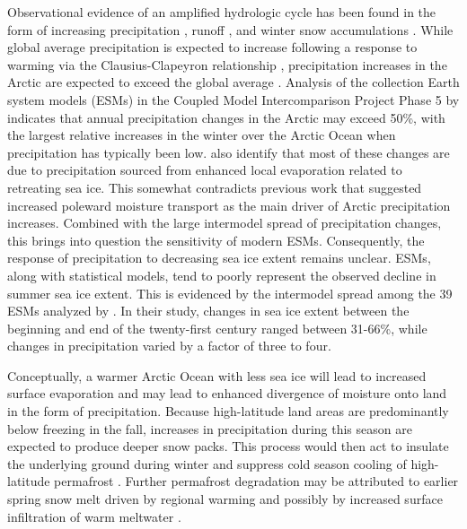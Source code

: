 Observational evidence of an amplified hydrologic cycle \citep{Stocker_2005} has been found in the form of increasing precipitation \citep{Rawlins_2006}, runoff \citep{Peterson_2002}, and winter snow accumulations \citep{Kohler_2006,Bulygina_2009}.
While global average precipitation is expected to increase following a response to warming via the Clausius-Clapeyron relationship \citep[e.g. ][]{Held_2006,Stephens_2008,Byrne_2015}, precipitation increases in the Arctic are expected to exceed the global average \citep{Stocker_2005}.
Analysis of the collection Earth system models (ESMs) in the Coupled Model Intercomparison Project Phase 5 \citep[CMIP5; ][]{Taylor_2012} by \citet{Bintanja_2014} indicates that annual precipitation changes in the Arctic may exceed 50\%, with the largest relative increases in the winter over the Arctic Ocean when precipitation has typically been low.
\citet{Bintanja_2014} also identify that most of these changes are due to precipitation sourced from enhanced local evaporation related to retreating sea ice.
This somewhat contradicts previous work that suggested increased poleward moisture transport as the main driver of Arctic precipitation increases.
Combined with the large intermodel spread of precipitation changes, this brings into question the sensitivity of modern ESMs. %
Consequently, the response of precipitation to decreasing sea ice extent remains unclear.
ESMs, along with statistical models, tend to poorly represent the observed decline in summer sea ice extent.
This is evidenced by the intermodel spread among the 39 ESMs analyzed by \citet{Bintanja_2014}.
In their study, changes in sea ice extent between the beginning and end of the twenty-first century ranged between 31-66\%, while changes in precipitation varied by a factor of three to four. %

Conceptually, a warmer Arctic Ocean with less sea ice will lead to increased surface evaporation and may lead to enhanced divergence of moisture onto land in the form of precipitation.
Because high-latitude land areas are predominantly below freezing in the fall, increases in precipitation during this season are expected to produce deeper snow packs.
This process would then act to insulate the underlying ground during winter and suppress cold season cooling of high-latitude permafrost \citep{Osterkamp_1999,Zhang_2005,Lawrence_2010}.
Further permafrost degradation may be attributed to earlier spring snow melt driven by regional warming and possibly by increased surface infiltration of warm meltwater \citep{Lawrence_2010}.

